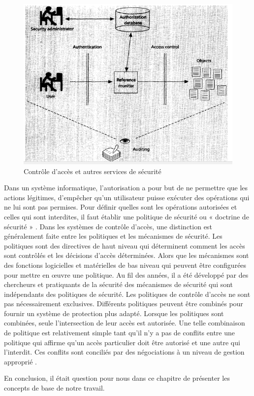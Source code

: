 \begin{figure}[h!]
    \centering
		\includegraphics[scale=0.7]{chap1/images/controle.png}
    \caption{Contrôle d'accès et autres services de sécurité \cite{sandhu94}}
	 \label{figcontrole}
\end{figure}

\label{sectionPolitiqueSécurité}
Dans un système informatique, l'autorisation a pour but de ne permettre que les actions légitimes, d'empêcher qu'un utilisateur puisse exécuter des opérations qui ne lui sont pas permises. Pour définir quelles sont les opérations autorisées et celles qui sont interdites, il faut établir une politique de sécurité ou « doctrine de sécurité » \cite{theseBenoit}. Dans les systèmes de contrôle d'accès, une distinction est généralement faite entre les politiques et les mécanismes de sécurité. Les politiques sont des directives de haut niveau qui déterminent comment les accès sont contrôlés et les décisions d'accès déterminées. Alors que les mécanismes sont des fonctions logicielles et matérielles de bas niveau qui peuvent être configurées pour mettre en œuvre une politique. Au fil des années, il a été développé par des chercheurs et pratiquants de la sécurité des mécanismes de sécurité qui sont indépendants des politiques de sécurité. Les politiques de contrôle d'accès ne sont pas nécessairement exclusives. Différents politiques peuvent être combinés pour fournir un système de protection plus adapté. Lorsque les politiques sont combinées, seule l'intersection de leur accès est autorisée. Une telle combinaison de politique est relativement simple tant qu'il n'y a pas de conflits entre une politique qui affirme qu'un accès particulier doit être autorisé et une autre qui l'interdit. Ces conflits sont conciliés par des négociations à un niveau de gestion approprié \cite{sandhu94}.

\label{sectionConclusion}
 En conclusion, il était question pour nous dans ce chapitre de présenter les concepts de base de notre travail.

